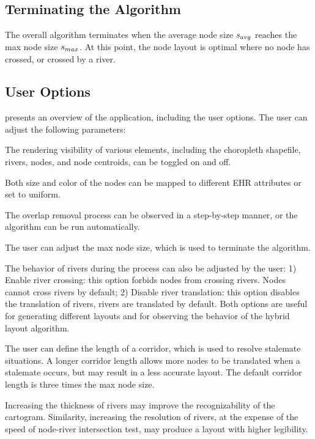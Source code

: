 
\subsection{Terminating the Algorithm}

The overall algorithm terminates when the average node size $ s_{avg} $ reaches the max node size $ s_{max} $. At this point, the node layout is optimal where no node has crossed, or crossed by a river.

\subsection{User Options}

 presents an overview of the application, including the user options. The user can adjust the following parameters:

 The rendering visibility of various elements, including the choropleth shapefile, rivers, nodes, and node centroids, can be toggled on and off.

 Both size and color of the nodes can be mapped to different EHR attributes or set to uniform.

 The overlap removal process can be observed in a step-by-step manner, or the algorithm can be run automatically. 

 The user can adjust the max node size, which is used to terminate the algorithm.

 The behavior of rivers during the process can also be adjusted by the user: 1) Enable river crossing: this option forbids nodes from crossing rivers. Nodes cannot cross rivers by default; 2) Disable river translation: this option disables the translation of rivers, rivers are translated by default. Both options are useful for generating different layouts and for observing the behavior of the hybrid layout algorithm.

 The user can define the length of a corridor, which is used to resolve stalemate situations. A longer corridor length allows more nodes to be translated when a stalemate occurs, but may result in a less accurate layout. The default corridor length is three times the max node size.

 Increasing the thickness of rivers may improve the recognizability of the cartogram. Similarity, increasing the resolution of rivers, at the expense of the speed of node-river intersection test, may produce a layout with higher legibility.

